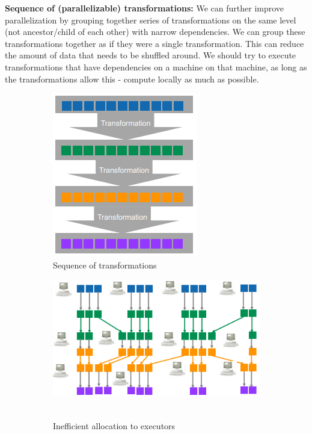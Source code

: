 \documentclass[11pt,oneside,a4paper]{article}
\begin{document}
\textbf{Sequence of (parallelizable) transformations:} We can further improve parallelization by grouping together series of transformations on the same level (not ancestor/child of each other) with narrow dependencies. We can group these transformations together as if they were a single transformation. This can reduce the amount of data that needs to be shuffled around. We should try to execute transformations that have dependencies on a machine on that machine, as long as the transformations allow this - compute locally as much as possible.

\begin{figure}[hb!]
	\centering
	\begin{subfigure}[t]{.3\textwidth}
		\centering
		\includegraphics[width=0.5\linewidth]{figures/spark_transformation_sequence}
		\caption{Sequence of transformations}
	\end{subfigure}%
	\begin{subfigure}[t]{.3\textwidth}
		\centering
		\includegraphics[width=0.8\linewidth]{figures/spark_transformation_sequence_ineff}\
		\caption{Inefficient allocation to executors}
	\end{subfigure}
	\begin{subfigure}[t]{.3\textwidth}

\end{subfigure}
\end{figure}
\end{document}
